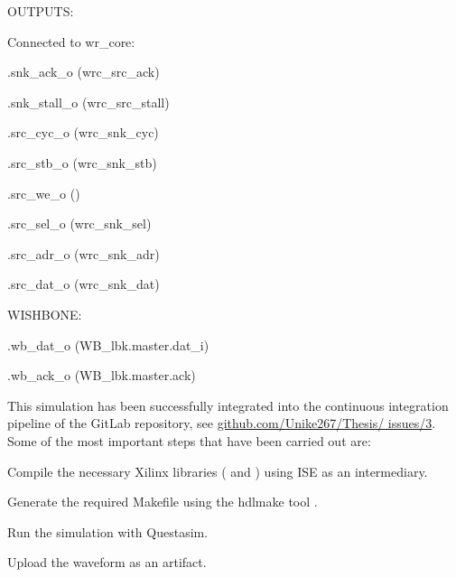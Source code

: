 \begin{dig}
\begin{dig}
\begin{dig}
        \end{dig}
    \item OUTPUTS:
        \begin{dig}
        \item Connected to wr\_core:
            \begin{dig}
            \item .snk\_ack\_o                  (wrc\_src\_ack)
            \item .snk\_stall\_o                (wrc\_src\_stall)
            \item 
            \item .src\_cyc\_o                  (wrc\_snk\_cyc)
            \item .src\_stb\_o                  (wrc\_snk\_stb)
            \item .src\_we\_o                   ()
            \item .src\_sel\_o                  (wrc\_snk\_sel)
            \item .src\_adr\_o                  (wrc\_snk\_adr)
            \item .src\_dat\_o                  (wrc\_snk\_dat)
            \end{dig}
        \item WISHBONE:
            \begin{dig}
            \item .wb\_dat\_o                   (WB\_lbk.master.dat\_i)
            \item .wb\_ack\_o                   (WB\_lbk.master.ack)
            \end{dig}
        \end{dig}
    \end{dig}
\end{dig}

\newpage 

\noindent This simulation has been successfully integrated into the continuous integration pipeline of the GitLab repository, see \href{https://github.com/Unike267/Thesis/issues/3}{github.com/Unike267/Thesis/ issues/3}.
Some of the most important steps that have been carried out are:

\begin{dig}
\item Compile the necessary Xilinx libraries ( and ) using ISE as an intermediary.
\item Generate the required Makefile using the hdlmake tool \cite{hdl-make:ohwr}.
\item Run the simulation with Questasim.
\item Upload the waveform as an artifact.
\end{dig}

